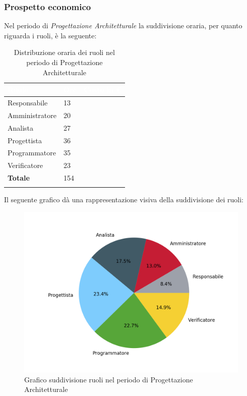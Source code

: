 \subsubsection{Prospetto economico}
Nel periodo di \textit{Progettazione Architetturale} la suddivisione oraria, per quanto riguarda i ruoli, è la seguente: 


\begin{longtable}{| C{.30\textwidth}| C{.15\textwidth}| C{.20\textwidth}|}
\hline
{}\textbf{\textcolor{white}{Ruolo}} & \textbf{\textcolor{white}{Ore}} & \textbf{\textcolor{white}{Costo in \euro}} \\
\hline 
Responsabile & 13 &  \\
\hline
{}Amministratore & 20 & \\
\hline
Analista & 27 &  \\
\hline
{}Progettista & 36 &  \\
\hline
Programmatore & 35 &  \\
\hline
{}Verificatore & 23 &  \\
\hline
\textbf{Totale} & 154 & \\ 
\hline

\caption{Distribuzione oraria dei ruoli nel periodo di Progettazione Architetturale}
\label{Distribuzione oraria per ruoli del periodo di pa}
\end{longtable}

Il seguente grafico dà una rappresentazione visiva della suddivisione dei ruoli:
\begin{figure}[H]
	\centering
  		\includegraphics[width=1\linewidth]{./images/torta_pa.png}
  		\caption{Grafico suddivisione ruoli nel periodo di Progettazione Architetturale}
  		\label{fig:grafico suddivione ruoli pa}
\end{figure}

